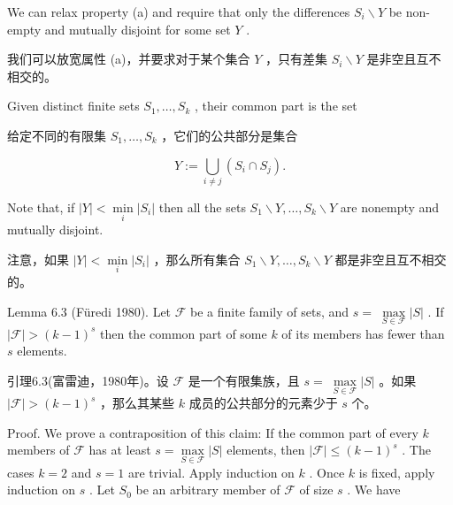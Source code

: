 \documentclass[10pt]{article}
\begin{document}
We can relax property (a) and require that only the differences \({S}_{i} \smallsetminus  Y\) be non-empty and mutually disjoint for some set \(Y\) .

\begin{tcolorbox}\relax
我们可以放宽属性 (a)，并要求对于某个集合 \(Y\) ，只有差集 \({S}_{i} \smallsetminus  Y\) 是非空且互不相交的。
\end{tcolorbox}

Given distinct finite sets \({S}_{1},\ldots ,{S}_{k}\) , their common part is the set

\begin{tcolorbox}\relax
给定不同的有限集 \({S}_{1},\ldots ,{S}_{k}\) ，它们的公共部分是集合
\end{tcolorbox}

\[
Y \mathrel{\text{ := }} \mathop{\bigcup }\limits_{{i \neq  j}}\left( {{S}_{i} \cap  {S}_{j}}\right) .
\]

Note that, if \(\left| Y\right|  < \mathop{\min }\limits_{i}\left| {S}_{i}\right|\) then all the sets \({S}_{1} \smallsetminus  Y,\ldots ,{S}_{k} \smallsetminus  Y\) are nonempty and mutually disjoint.

\begin{tcolorbox}\relax
注意，如果 \(\left| Y\right|  < \mathop{\min }\limits_{i}\left| {S}_{i}\right|\) ，那么所有集合 \({S}_{1} \smallsetminus  Y,\ldots ,{S}_{k} \smallsetminus  Y\) 都是非空且互不相交的。
\end{tcolorbox}

Lemma 6.3 (Füredi 1980). Let \(\mathcal{F}\) be a finite family of sets, and \(s = \; \mathop{\max }\limits_{{S \in  \mathcal{F}}}\left| S\right|\) . If \(\left| \mathcal{F}\right|  > {\left( k - 1\right) }^{s}\) then the common part of some \(k\) of its members has fewer than \(s\) elements.

\begin{tcolorbox}\relax
引理6.3(富雷迪，1980年)。设 \(\mathcal{F}\) 是一个有限集族，且 \(s = \; \mathop{\max }\limits_{{S \in  \mathcal{F}}}\left| S\right|\) 。如果 \(\left| \mathcal{F}\right|  > {\left( k - 1\right) }^{s}\) ，那么其某些 \(k\) 成员的公共部分的元素少于 \(s\) 个。
\end{tcolorbox}

Proof. We prove a contraposition of this claim: If the common part of every \(k\) members of \(\mathcal{F}\) has at least \(s = \mathop{\max }\limits_{{S \in  \mathcal{F}}}\left| S\right|\) elements, then \(\left| \mathcal{F}\right|  \leq  {\left( k - 1\right) }^{s}\) . The cases \(k = 2\) and \(s = 1\) are trivial. Apply induction on \(k\) . Once \(k\) is fixed, apply induction on \(s\) . Let \({S}_{0}\) be an arbitrary member of \(\mathcal{F}\) of size \(s\) . We have
\end{document}
